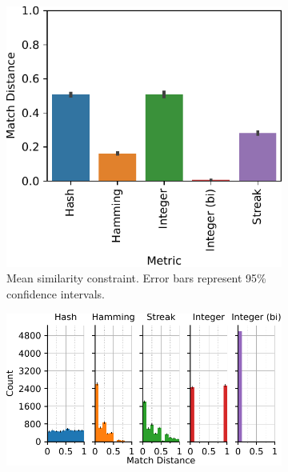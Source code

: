 \begin{figure}[!htbp]
\begin{center}
\begin{subfigure}[b]{\linewidth}
\begin{minipage}{0.6\linewidth}
\includegraphics[width=\linewidth]{img/sphere/bitweight=0dot5+seed=1+title=dimensionality_barplot+_data_hathash_hash=c0f6c5cf854ff253+_script_fullcat_hash=a3db428966bb187a+ext=}
\end{minipage}
\begin{minipage}{0.35\linewidth}
\caption{
Mean similarity constraint.
Error bars represent 95\% confidence intervals.
}
\label{fig:sphere_barplot}
\end{minipage}
\end{subfigure}
\begin{minipage}{\linewidth}
\begin{subfigure}[b]{\linewidth}
\centering
\includegraphics[width=\linewidth]{img/sphere/bitweight=0dot5+seed=1+title=dimensionality_distnplot+viz=hist+_data_hathash_hash=c0f6c5cf854ff253+_script_fullcat_hash=cda229fb13f5a152+ext=}

\end{subfigure}
\end{minipage}
\end{center}
\end{figure}
